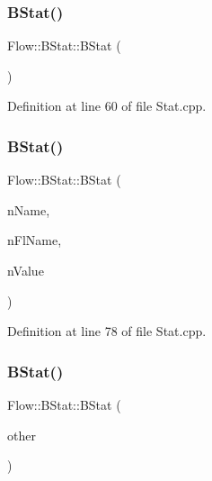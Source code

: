\subsubsection{\texorpdfstring{B\+Stat()}{BStat()}\hspace{0.1cm}{\footnotesize\ttfamily [1/3]}}
{\footnotesize\ttfamily Flow\+::\+B\+Stat\+::\+B\+Stat (\begin{DoxyParamCaption}{ }\end{DoxyParamCaption})}



Definition at line 60 of file Stat.\+cpp.

\hypertarget{class_flow_1_1_b_stat_a757ab02769bb9990f13d9ba2e7f159a0}{}\label{class_flow_1_1_b_stat_a757ab02769bb9990f13d9ba2e7f159a0} 
\subsubsection{\texorpdfstring{B\+Stat()}{BStat()}\hspace{0.1cm}{\footnotesize\ttfamily [2/3]}}
{\footnotesize\ttfamily Flow\+::\+B\+Stat\+::\+B\+Stat (\begin{DoxyParamCaption}\item[{const std\+::string \&}]{n\+Name,  }\item[{const std\+::string \&}]{n\+Fl\+Name,  }\item[{unsigned char}]{n\+Value }\end{DoxyParamCaption})}



Definition at line 78 of file Stat.\+cpp.

\hypertarget{class_flow_1_1_b_stat_adf5f5a63aa82025e4bd86e0df0c5dfb9}{}\label{class_flow_1_1_b_stat_adf5f5a63aa82025e4bd86e0df0c5dfb9} 
\subsubsection{\texorpdfstring{B\+Stat()}{BStat()}\hspace{0.1cm}{\footnotesize\ttfamily [3/3]}}
{\footnotesize\ttfamily Flow\+::\+B\+Stat\+::\+B\+Stat (\begin{DoxyParamCaption}\item[{const \hyperlink{class_flow_1_1_b_stat}{B\+Stat} \&}]{other }\end{DoxyParamCaption})}



